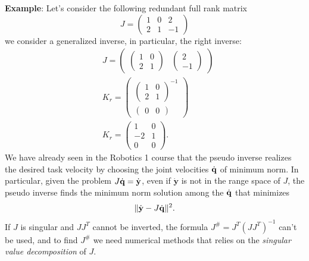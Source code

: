 \documentclass[10pt, a4paper]{report}
\begin{document}
\textbf{Example}: Let's consider the following redundant full rank matrix $$J=\begin{pmatrix}
    1&0&2\\ 
    2&1&-1
\end{pmatrix}$$
we consider a generalized inverse, in particular, the right inverse:\begin{align*}
    &J=\begin{pmatrix}
    \begin{pmatrix}
    1&0\\ 
    2&1
\end{pmatrix}& \begin{pmatrix}
    2\\-1
\end{pmatrix}
\end{pmatrix}\\ 
&K_r=\begin{pmatrix}
    \begin{pmatrix}
    1&0\\ 
    2&1
\end{pmatrix}^{-1}\\\begin{pmatrix}
    0&0
\end{pmatrix}
\end{pmatrix}\\
&K_r=\begin{pmatrix}
    1&0\\
    -2&1\\
    0&0
\end{pmatrix}.
\end{align*}
We have already seen in the Robotics 1 course that the pseudo inverse realizes the desired task velocity by choosing the joint velocities ${\dot{\mathbf q}}$ of minimum norm. In particular, given the problem $J{\dot{\mathbf q}}=\dot{\mathbf y}$, even if $\dot{\mathbf y}$ is not in the range space of $J$, the pseudo inverse finds the minimum norm solution among the ${\dot{\mathbf q}}$ that minimizes\begin{equation}
    \|\dot{\mathbf y}-J{\dot{\mathbf q}}\|^2.
\end{equation}
If $J$ is singular and $JJ^T$ cannot be inverted, the formula $J^\#=J^T(JJ^T)^{-1}$ can't be used, and to find $J^\#$ we need numerical methods that relies on the \textit{singular value decomposition} of $J$.
\end{document}
